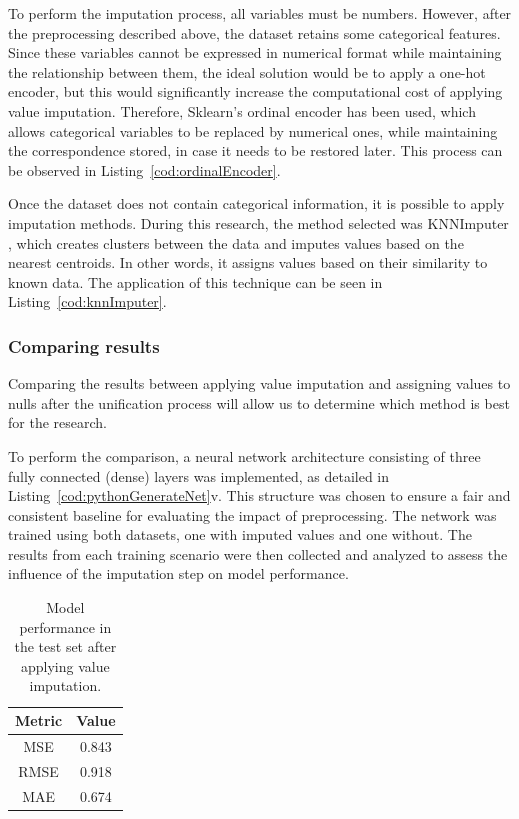 To perform the imputation process, all variables must be numbers. However, after the preprocessing described above, the dataset retains some categorical features. Since these variables cannot be expressed in numerical format while maintaining the relationship between them, the ideal solution would be to apply a one-hot encoder, but this would significantly increase the computational cost of applying value imputation. Therefore, Sklearn's ordinal encoder \cite{scikit-learn-ordinalencoder} has been used, which allows categorical variables to be replaced by numerical ones, while maintaining the correspondence stored, in case it needs to be restored later. This process can be observed in Listing~\ref{cod:ordinalEncoder}.

Once the dataset does not contain categorical information, it is possible to apply imputation methods. During this research, the method selected was KNNImputer \cite{scikit-learn-knnimputer}, which creates clusters between the data and imputes values based on the nearest centroids. In other words, it assigns values based on their similarity to known data. The application of this technique can be seen in Listing~\ref{cod:knnImputer}.

\subsubsection{Comparing results}

Comparing the results between applying value imputation and assigning values to nulls after the unification process will allow us to determine which method is best for the research.

To perform the comparison, a neural network architecture consisting of three fully connected (dense) layers was implemented, as detailed in Listing~\ref{cod:pythonGenerateNet}v. This structure was chosen to ensure a fair and consistent baseline for evaluating the impact of preprocessing. The network was trained using both datasets, one with imputed values and one without. The results from each training scenario were then collected and analyzed to assess the influence of the imputation step on model performance.

\begin{table}[H]
    \centering
    \begin{tabular}{|c|c|}
    \hline
    \textbf{Metric} & \textbf{Value} \\
    \hline
    MSE  & 0.843 \\
    RMSE & 0.918 \\
    MAE  & 0.674 \\
    \hline
    \end{tabular}
    \caption{Model performance in the test set after applying value imputation.}
    \label{tab:model_metrics_imputing_values}
\end{table}

